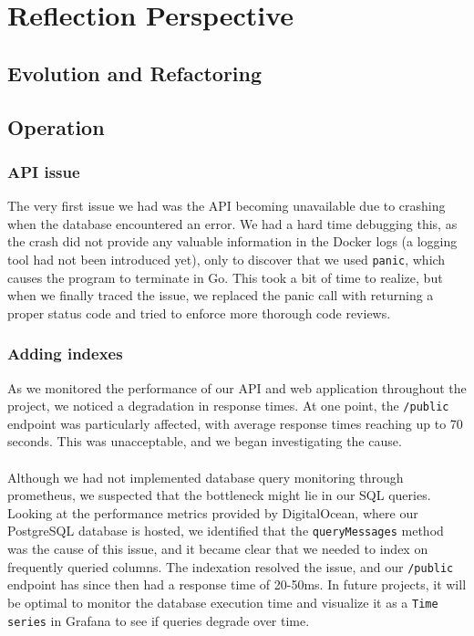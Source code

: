 \section{Reflection Perspective}
\subsection{Evolution and Refactoring}


\subsection{Operation}\label{operation}
\subsubsection{API issue}
The very first issue we had was the API becoming unavailable due to crashing when the database encountered an error. We had a hard time debugging this, as the crash did not provide any valuable information in the Docker logs (a logging tool had not been introduced yet), only to discover that we used \texttt{panic}, which causes the program to terminate in Go. This took a bit of time to realize, but when we finally traced the issue, we replaced the panic call with returning a proper status code and tried to enforce more thorough code reviews.

\subsubsection{Adding indexes}
As we monitored the performance of our API and web application throughout the project, we noticed a degradation in response times. At one point, the \texttt{/public} endpoint was particularly affected, with average response times reaching up to 70 seconds. This was unacceptable, and we began investigating the cause.
\\\\
Although we had not implemented database query monitoring through prometheus, we suspected that the bottleneck might lie in our SQL queries. Looking at the performance metrics provided by DigitalOcean, where our PostgreSQL database is hosted, we identified that the \texttt{queryMessages} method was the cause of this issue, and it became clear that we needed to index on frequently queried columns. The indexation resolved the issue, and our \texttt{/public} endpoint has since then had a response time of 20-50ms. In future projects, it will be optimal to monitor the database execution time and visualize it as a \texttt{Time series} in Grafana to see if queries degrade over time.

